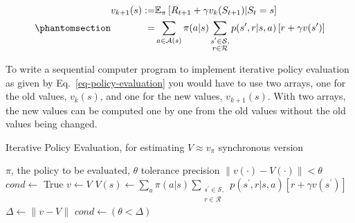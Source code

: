 \documentclass[
  letterpaper,
]{krantz}
\theoremstyle{plain}
\theoremstyle{definition}
\theoremstyle{definition}
\theoremstyle{remark}
\begin{document}
\begin{equation}\phantomsection\label{eq-policy-evaluation}{
    \begin{aligned}
        v_{k+1}(s) := & \mathbb{E}_{\pi} \left[
            R_{t+1} + \gamma v_k(S_{t+1}) 
            | S_t=s
        \right] 
        \\
        = &
            \sum_{a\in\mathcal{A}(s)}
            \pi(a|s) 
                \sum_{
                    \substack{s^{\prime}\in\mathcal{S},
                    \\ 
                    r \in \mathcal{R}}
                }
                p(s^{\prime}, r |s ,a)
                \left[ 
                    r +\gamma v(s^{\prime})
                \right]
    \end{aligned}
}\end{equation}

To write a sequential computer program to implement iterative policy
evaluation as given by Eq.~\ref{eq-policy-evaluation} you would have to
use two arrays, one for the old values, \(v_k(s)\), and one for the new
values, \(v_{k+1} (s)\). With two arrays, the new values can be computed
one by one from the old values without the old values being changed.

\begin{algorithm}[htb!]
    \caption{Iterative Policy Evaluation, for estimating $V \approx v_{\pi}$ 
    synchronous version}
    \label{alg-test-text-style}
\begin{algorithmic}[1]
        \Require $\pi$, the policy to be evaluated, $\theta$ tolerance precision
        \Ensure $\|v(\cdot)- V(\cdot)\|< \theta$
            \State $cond \leftarrow$ True
            \State $v \leftarrow V$
                \State $
                        \displaystyle
                        V(s) \leftarrow 
                            \sum_{a}
                                \pi(a|s) 
                                \sum_{
                                    \substack{s^{\prime}\in\mathcal{S},
                                    \\ 
                                    r \in \mathcal{R}}
                                }
                                p(s^{\prime}, r |s ,a)
                                \left[ 
                                    r +\gamma v(s^{\prime})
                                \right]
                    $
            \EndFor
            \State $\Delta \leftarrow \|v -V \|$
            \State $cond \leftarrow (\theta < \Delta)$
        \EndWhile
        \EndProcedure
    \end{algorithmic}
\end{algorithm}
\end{document}

